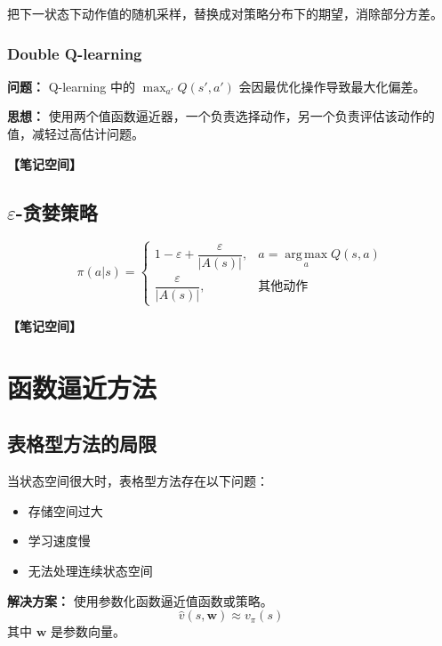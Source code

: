 \documentclass[12pt,a4paper]{article}
\newcommand{\notespace}[1][3cm]{%
  \vspace{#1}%
  \noindent\textbf{【笔记空间】}%
  \vspace{#1}%
}
\newcommand{\1}{\mathbf{1}}
\newcommand{\argmax}{\operatorname*{arg\,max}}
\begin{document}
把下一状态下动作值的随机采样，替换成对策略分布下的期望，消除部分方差。

\subsubsection*{Double Q-learning}

\textbf{问题：} Q-learning 中的 $\max_{a'}Q(s',a')$ 会因最优化操作导致最大化偏差。

\textbf{思想：} 使用两个值函数逼近器，一个负责选择动作，另一个负责评估该动作的值，减轻过高估计问题。

\notespace[2cm]

\subsection{$\varepsilon$-贪婪策略}

\begin{equation}
\pi(a|s)= \begin{cases} 1-\varepsilon+\dfrac{\varepsilon}{|A(s)|}, & a=\argmax_a Q(s,a) \\ \dfrac{\varepsilon}{|A(s)|}, & \text{其他动作} \end{cases}
\end{equation}

\notespace[3cm]

\newpage

\section{函数逼近方法}

\subsection{表格型方法的局限}

当状态空间很大时，表格型方法存在以下问题：

\begin{itemize}[leftmargin=2em]
  \item 存储空间过大
  \item 学习速度慢
  \item 无法处理连续状态空间
\end{itemize}

\begin{keybox}
\textbf{解决方案：} 使用参数化函数逼近值函数或策略。
\begin{equation}
\hat{v}(s,\mathbf{w})\approx v_\pi(s)
\end{equation}
其中 $\mathbf{w}$ 是参数向量。
\end{keybox}
\end{document}
